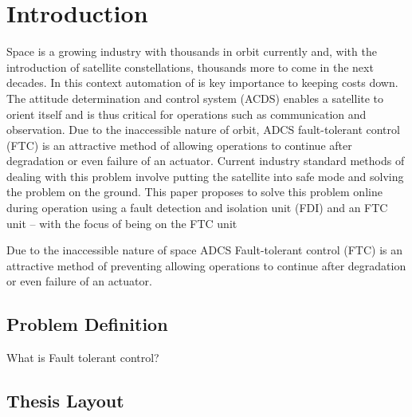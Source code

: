 \graphicspath{{introduction/fig/}}

\chapter{Introduction}
\label{chap:introduction}

Space is a growing industry with thousands in orbit currently and, with the introduction of satellite constellations,
thousands more to come in the next decades. In this context automation of is key importance to keeping costs down. 
The attitude determination and control system (ACDS) enables a
satellite to orient itself and is thus critical for operations such as communication
and observation. Due to the inaccessible nature of orbit, ADCS fault-tolerant
control (FTC) is an attractive method of allowing operations to continue after
degradation or even failure of an actuator. Current industry standard methods
of dealing with this problem involve putting the satellite into safe mode and
solving the problem on the ground. This paper proposes to solve this problem
online during operation using a fault detection and isolation unit (FDI) and an
FTC unit – with the focus of being on the FTC unit

Due to the inaccessible nature of space ADCS Fault-tolerant control (FTC) is an attractive method of preventing allowing operations to continue after degradation or
even failure of an actuator. 

\section{Problem Definition}

What is Fault tolerant control?

\section{Thesis Layout}


